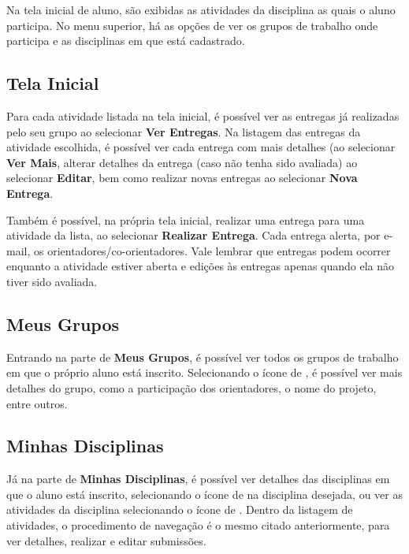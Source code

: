 Na tela inicial de aluno, são exibidas as atividades da disciplina as quais o aluno participa. No menu superior, há as opções de ver os grupos de trabalho onde participa e as disciplinas em que está cadastrado.

\subsection{Tela Inicial}
Para cada atividade listada na tela inicial, é possível ver as entregas já realizadas pelo seu grupo ao selecionar \textbf{Ver Entregas}. Na listagem das entregas da atividade escolhida, é possível ver cada entrega com mais detalhes (ao selecionar \textbf{Ver Mais}, alterar detalhes da entrega (caso não tenha sido avaliada) ao selecionar \textbf{Editar}, bem como realizar novas entregas ao selecionar \textbf{Nova Entrega}.

Também é possível, na própria tela inicial, realizar uma entrega para uma atividade da lista, ao selecionar \textbf{Realizar Entrega}. Cada entrega alerta, por e-mail, os orientadores/co-orientadores. Vale lembrar que entregas podem ocorrer enquanto a atividade estiver aberta e edições às entregas apenas quando ela não tiver sido avaliada.

\subsection{Meus Grupos}
Entrando na parte de \textbf{Meus Grupos}, é possível ver todos os grupos de trabalho em que o próprio aluno está inscrito. Selecionando o ícone de \faEye, é possível ver mais detalhes do grupo, como a participação dos orientadores, o nome do projeto, entre outros.

\subsection{Minhas Disciplinas}
Já na parte de \textbf{Minhas Disciplinas}, é possível ver detalhes das disciplinas em que o aluno está inscrito, selecionando o ícone de \faEye na disciplina desejada, ou ver as atividades da disciplina selecionando o ícone de \faListUl. Dentro da listagem de atividades, o procedimento de navegação é o mesmo citado anteriormente, para ver detalhes, realizar e editar submissões.

